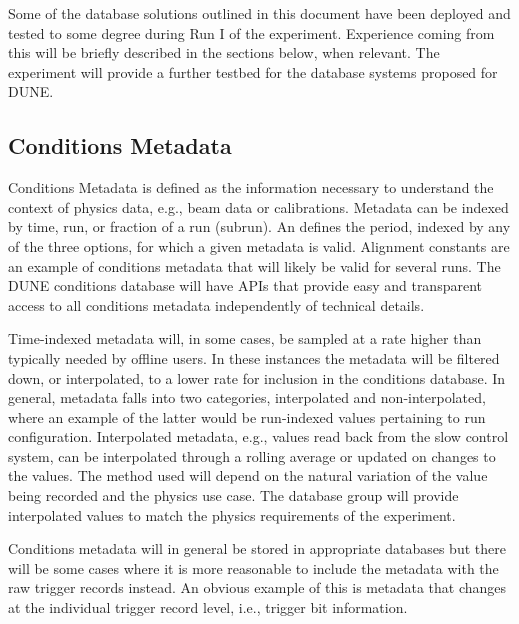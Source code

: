 \documentclass[../main-v1.tex]{subfiles}
\begin{document}
Some of the database solutions outlined in this document have been deployed and tested to some degree during Run I of the  experiment. Experience coming from %
this will be briefly described in the sections below, when relevant. %
The  experiment will provide a further testbed for the database systems proposed for DUNE.  

\subsection{Conditions Metadata}
\label{subsec:db:conditions_metadata} 

Conditions Metadata is defined as the information necessary to understand the context of physics data, e.g., beam data or calibrations.
Metadata can be indexed by %
time, run, or fraction of a run (subrun). 
An 
defines the period, indexed by any of the three options, for which a given metadata is valid.
Alignment constants are an example of conditions metadata that will likely be valid for several runs. 
The DUNE conditions database will have APIs that provide easy and transparent access to all conditions metadata independently of technical details.

Time-indexed metadata will, in some cases, be sampled at a rate higher than typically needed by offline users. In these instances the metadata will be filtered down, or interpolated, to a lower rate for inclusion in the conditions database. In general, metadata falls into two categories, interpolated and non-interpolated, where an example of the latter would be run-indexed values pertaining to run configuration. Interpolated metadata, e.g., values read back from the slow control system, can be interpolated through a rolling average or updated on changes to the values. The method used will depend on the natural variation of the value being recorded and the physics use case. 
The database group will provide interpolated values to match the physics requirements of the experiment.  

Conditions metadata will in general be stored in appropriate databases but there will be some cases where it is more reasonable to include the metadata with the raw trigger records instead. An obvious example of this is metadata that changes at the individual trigger record level, i.e., trigger bit information. 
\end{document}

